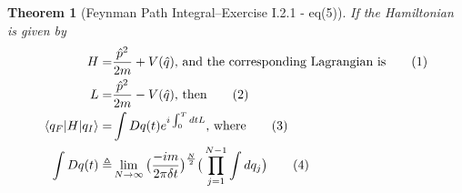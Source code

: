 \documentclass[]{article}
\newcommand\numberthis{\addtocounter{equation}{1}\tag{\theequation}}
\newtheorem{thm}{Theorem}
\begin{document}
\begin{thm}[Feynman Path Integral--Exercise I.2.1 - eq(5)]
	If the Hamiltonian is given by
	\begin{align*}
		H =& \frac{\hat{p}^2}{2m} + V(\hat{q}) \text{, and the corresponding Lagrangian is} \numberthis \label{eq:H} \\
		L =& \frac{\hat{p}^2}{2m} - V(\hat{q}) \text{, then} \numberthis \label{eq:L}\\
		\braket{q_F\vert H\vert q_I} =& \int Dq(t) e^{i \int_{0}^{T}dt L} \text{, where}\numberthis \label{eq:Path:itegral}\\	
		\int Dq(t)\triangleq& \lim_{N\rightarrow\infty} \big(\frac{-i m}{2\pi \delta t}\big)^\frac{N}{2} \big(\prod_{j=1}^{N-1} \int dq_j\big) \numberthis \label{eq:D}
	\end{align*}
\end{thm}
\end{document}
